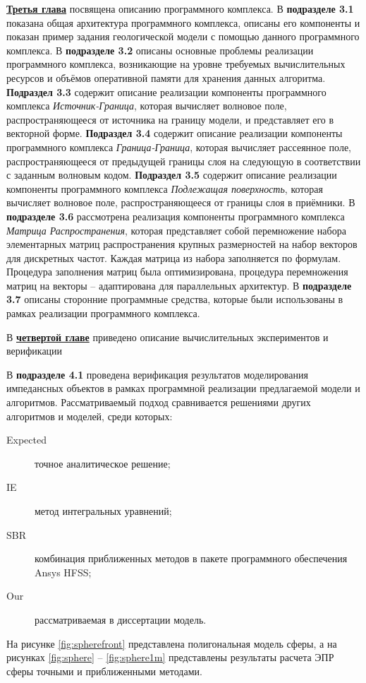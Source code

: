 \underline{\textbf{Третья глава}} посвящена описанию программного комплекса.
В \textbf{подразделе 3.1} показана общая архитектура программного комплекса, описаны его
компоненты и показан пример задания геологической модели с помощью данного программного
комплекса. В \textbf{подразделе 3.2} описаны основные проблемы реализации программного
комплекса, возникающие на уровне требуемых вычислительных ресурсов и объёмов
оперативной памяти для хранения данных алгоритма. \textbf{Подраздел 3.3} содержит описание
реализации компоненты программного комплекса \textit{Источник-Граница}, которая вычисляет
волновое поле, распространяющееся от источника на границу модели, и представляет его в
векторной форме. \textbf{Подраздел 3.4} содержит описание реализации компоненты программного
комплекса \textit{Граница-Граница}, которая вычисляет рассеянное поле, распространяющееся от
предыдущей границы слоя на следующую в соответствии с заданным волновым кодом.
\textbf{Подраздел 3.5} содержит описание реализации компоненты программного комплекса \textit{Подлежащая
поверхность}, которая вычисляет волновое поле, распространяющееся от границы слоя в
приёмники. В \textbf{подразделе 3.6} рассмотрена реализация компоненты программного комплекса
\textit{Матрица Распространения}, которая представляет собой перемножение набора элементарных
матриц распространения крупных размерностей на набор векторов для дискретных частот.
Каждая матрица из набора заполняется по формулам. Процедура заполнения матриц
была оптимизирована, процедура перемножения матриц на векторы – адаптирована для параллельных архитектур.
В \textbf{подразделе 3.7} описаны сторонние программные средства, которые были использованы в
рамках реализации программного комплекса.




В \underline{\textbf{четвертой главе}} приведено описание вычислительных экспериментов и верификации

В \textbf{подразделе 4.1} проведена верификация результатов моделирования импедансных объектов
в рамках программной реализации предлагаемой модели и алгоритмов.
Рассматриваемый подход сравнивается решениями других алгоритмов и моделей,
среди которых:
\begin{description}
    \item[Expected] точное аналитическое решение;
    \item[IE] метод интегральных уравнений;
    \item[SBR] комбинация приближенных методов в пакете программного обеспечения Ansys HFSS;
    \item[Our] рассматриваемая в диссертации модель.
\end{description}
На рисунке \ref{fig:spherefront} представлена полигональная модель сферы, а на рисунках
\ref{fig:sphere} – \ref{fig:sphere1m} представлены результаты расчета ЭПР сферы точными и приближенными методами.

